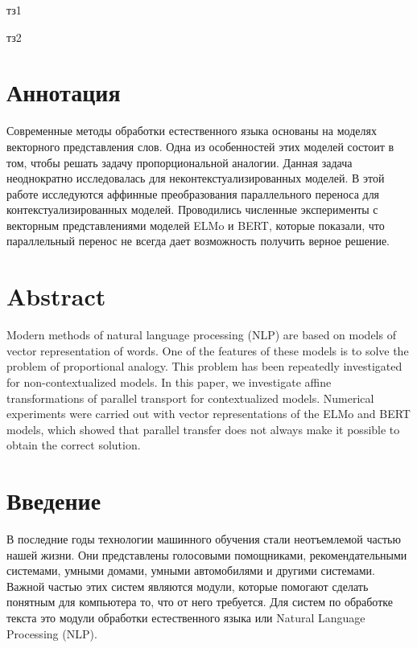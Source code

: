 \documentclass[a4paper,14pt]{article}
\begin{document}
 	
	

\pagebreak

тз1

\pagebreak

тз2	

\pagebreak
	
\section*{\normalsize \hfill Аннотация \hfill}

\sloppy

Современные методы обработки естественного языка основаны на моделях векторного представления слов.
Одна из особенностей этих моделей состоит в том, чтобы решать задачу пропорциональной аналогии.
Данная задача неоднократно исследовалась для неконтекстуализированных моделей.
В этой работе исследуются аффинные преобразования параллельного переноса для контекстуализированных моделей.
Проводились численные эксперименты с векторным представлениями моделей ELMo и BERT, которые показали, что параллельный перенос не всегда дает возможность получить верное решение.

\section*{\normalsize \hfill Abstract \hfill}

Modern methods of natural language processing (NLP) are based on models of vector representation of words.
One of the features of these models is to solve the problem of proportional analogy.
This problem has been repeatedly investigated for non-contextualized models.
In this paper, we investigate affine transformations of parallel transport for contextualized models.
Numerical experiments were carried out with vector representations of the ELMo and BERT models, which showed that parallel transfer does not always make it possible to obtain the correct solution.

\newpage

\tableofcontents
\pagebreak

\section*{Введение}


В последние годы технологии машинного обучения стали неотъемлемой частью нашей жизни. 
Они представлены голосовыми помощниками, рекомендательными системами, умными домами, умными автомобилями и другими системами.
Важной частью этих систем являются модули, которые помогают сделать понятным для компьютера то, что от него требуется.
Для систем по обработке текста это модули обработки естественного языка или Natural Language Processing (NLP).
\end{document}
